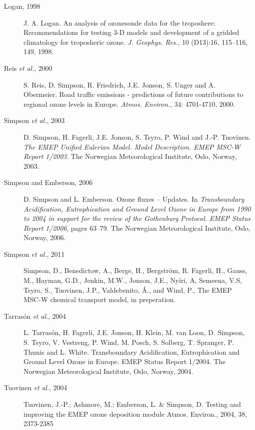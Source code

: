 \begin{description}
\item[Logan, 1998] J. A. Logan. An analysis of ozonesonde data for the
  troposhere: Recommendations for testing 3-D models and development
  of a gridded climatology for troposheric ozone. {\it
    J. Geophys. Res.}, 10 (D13):16, 115--116, 149, 1998.


\item[Reis {\sl et al.}, 2000] S. Reis, D. Simpson, R. Friedrich,
  J.E. Jonson, S. Unger and A. Obermeier. Road traffic emissions -
  predictions of future  contributions to regional ozone levels in Europe.
{\it Atmos. Environ.}, 34: 4701-4710, 2000.

\item[Simpson {\sl et al.}, 2003] D. Simpson, H. Fagerli, J.E. Jonson, 
                    S. Tsyro, P. Wind and J.-P. Tuovinen.
{\it The EMEP Unified Eulerian Model. Model Description. EMEP MSC-W Report
1/2003}. The Norwegian
Meteorological Institute, Oslo, Norway, 2003.


\item[Simpson and Emberson, 2006] D. Simpson and L. Emberson. Ozone
  fluxes -- Updates.  
 In {\it Transboundary Acidification,
  Eutrophication  and Ground Level Ozone in Europe from 1990 to 2004
  in support for the review of the Gothenburg Protocol. EMEP Status
                   Report 1/2006}, pages 63--79. The Norwegian
Meteorological Institute, Oslo, Norway, 2006. 

\item[Simpson {\sl et al.}, 2011]
Simpson, D., Benedictow, A., Berge, H., Bergstr\"om, R.  Fagerli, H., Gauss, M., Hayman, G.D., Jenkin, M.W., Jonson, J.E., Ny\'iri, A, Semeena, V.S, Tsyro, S., Tuovinen, J.P., Valdebenito, \'A., and Wind, P.,
The EMEP  MSC-W chemical transport model, in preperation.

\item[Tarras\'on {\sl et al.}, 2004] L. Tarras{\'o}n, H. Fagerli, 
              J.E. Jonson, H. Klein, M. van Loon,  
                   D. Simpson, S. Tsyro, V. Vestreng,
                   P. Wind, M. Posch, S. Solberg, T. Spranger,
                   P. Thunis and L. White. Transboundary
                   Acidification, Eutrophication 
                   and Ground Level Ozone in Europe. EMEP Status
                   Report 1/2004. The Norwegian
Meteorological Institute, Oslo, Norway, 2004. 

\item[Tuovinen {\sl et al.}, 2004] Tuovinen, J.-P.; Ashmore, M.; Emberson, L. \& Simpson, D. Testing and improving the EMEP ozone deposition module Atmos. Environ., 2004, 38, 2373-2385



\end{description}
